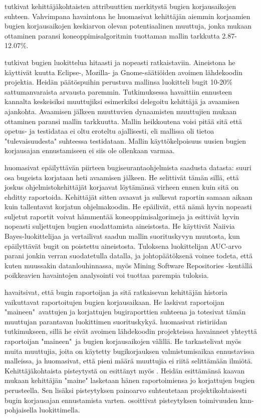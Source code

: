 \documentclass[utf8]{gradu3}
\begin{document}
\textcite{Anh-2011} tutkivat kehittäjäkohtaisten attribuuttien merkitystä bugien
korjausaikojen suhteen. Vahvimpana havaintona he huomasivat kehittäjän aiemmin
korjaamien bugien korjausaikojen keskiarvon olevan potentiaalinen muuttuja,
jonka mukaan ottaminen paransi koneoppimisalgoritmin tuottaman mallin tarkkutta
2.87-12.07\%.

\textcite{Giger-2010} tutkivat bugien luokittelua hitaasti ja nopeasti
ratkaistaviin. Aineistona he käyttivät kuutta Eclipse-, Mozilla- ja
Gnome-säätiöiden avoimen lähdekoodin projektia. Heidän päätöspuihin perustuva
mallinsa luokitteli bugit 10-20\% sattumanvaraista arvausta paremmin.
Tutkimuksessa havaittiin ennusteen kannalta keskeisiksi muuttujiksi esimerkiksi
delegoitu kehittäjä ja avaamisen ajankohta. Avaamisen jälkeen muuttuvien
dynaamisten muuttujien mukaan ottaminen paransi mallin tarkkuutta. Mallin
heikkoutena voisi pitää sitä että opetus- ja testidataa ei oltu eroteltu
ajallisesti, eli mallissa oli tietoa "tulevaisuudesta" suhteessa testidataan.
Mallin käyttökelpoisuus uusien bugien korjausajan ennustamiseen ei siis ole
ollenkaan varmaa.

\textcite{Lamkanfi-2012} huomasivat epäilyttävän piirteen bugiseurantaohjelmista
saadusta datasta: suuri osa bugeista korjataan heti avaamisen jälkeen. He
selittivät tämän sillä, että joskus ohjelmistokehittäjät korjaavat löytämänsä
virheen ennen kuin sitä on ehditty raportoida. Kehittäjät sitten avaavat ja
sulkevat raportin samaan aikaan kuin tallentavat korjatun ohjelmakoodin. He
epäilivät, että nämä hyvin nopeasti suljetut raportit voivat hämmentää
koneoppimisalgorimeja ja esittivät hyvin nopeasti suljettujen bugien
suodattamista aineistosta. %
He käyttivät Naiivia Bayes-luokittelijaa ja vertailivat saadun mallin
suorituskyvyn muutosta, kun epäilyttävät bugit on poistettu aineistosta.
Tuloksena luokittelijan AUC-arvo parani jonkin verran suodatetulla datalla, ja
johtopäätöksenä voinee todeta, että kuten muussakin datanlouhinnassa, myös
Mining Software Repositories -kentällä poikkeavien havaintojen analysointi voi
tuottaa parempia tuloksia.
 

\textcite{Guo-2010} havaitsivat, että bugin raportoijan ja sitä ratkaisevan
kehittäjän  historia vaikuttavat raportoitujen bugien korjausaikaan. He laskivat
raportoijan "maineen"\ avattujen ja korjattujen bugiraporttien suhteena ja
totesivat tämän muuttujan parantavan luokittimen suorituskykyä.%
\textcite{Bhattacharya-2011} huomasivat ristiriidan \parencite{Guo-2010}
tutkimukseen, sillä he eivät avoimen lähdekoodin projekteissa havainneet
yhteyttä raportoijan "maineen"\ ja bugien korjausaikojen välillä. He
tarkastelivat myös muita muuttujia, joita on käytetty bugikorjauksen
valmistumisaikaa ennustavissa malleissa, ja huomasivat, että pieni määrä
muuttujia ei riitä selittämään ilmiötä. \parencite{Bhattacharya-2011}
Kehittäjäkohtaista pisteytystä on esittänyt myös \textcite{ramarao-2016}. Heidän
esittämänsä kaavan mukaan kehittäjän "maine" lasketaan hänen raportoimiensa jo
korjattujen bugien perusteella. Sen lisäksi pisteytyksen painoarvo suhteutetaan
projektikohtaisesti bugin korjausajan ennustamista varten.
\textcite{ramarao-2016} osoittivat pisteytyksen toimivuuden knn-pohjaisella
luokittimella.
\end{document}
